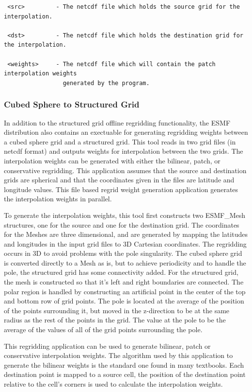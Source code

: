 \begin{verbatim}
 <src>         - The netcdf file which holds the source grid for the interpolation. 
 
 <dst>         - The netcdf file which holds the destination grid for the interpolation. 

 <weights>     - The netcdf file which will contain the patch interpolation weights 
                 generated by the program.

\end{verbatim}

\subsubsection{Cubed Sphere to Structured Grid}

 In addition to the structured grid offline regridding functionality, the ESMF distribution also 
contains an exectuable for generating regridding weights between a cubed sphere grid and
a structured grid. This tool reads in
two grid files (in netcdf format) and outputs weights for interpolation
between the two grids.  The interpolation weights can be generated with either the bilinear, patch, or
conservative regridding. This application assumes that the source and destination grids
are spherical and that the coordinates given in the files are latitude and longitude
values. This file based regrid weight generation application generates the interpolation weights
in parallel.

 To generate the interpolation weights, this tool first constructs two ESMF\_Mesh 
structures, one for the source and one for the destination grid. 
The coordinates for the Meshes are three dimensional, and are generated by mapping 
the latitudes and longitudes in the input grid files to 
3D Cartesian coordinates. The regridding occurs in 3D to avoid
problems with the pole singularity. The cubed sphere grid is converted directly to 
a Mesh as is, but to achieve periodicity and to handle the pole, the structured grid
has some connectivity added. For the structured grid, the mesh is constructed so that 
it's left and right boundaries are connected. The polar region is handled by constructing 
an artificial point in the center of the top and bottom row of grid points. 
The pole is located at the average of the position of the points surrounding
it, but moved in the z-direction to be at the same radius as the rest of the points
in the grid. The value at the pole to be the average of the values
of all of the grid points surrounding the pole. 

 This regridding application can be used to generate bilinear, patch or conservative interpolation weights. The 
algorithm used by this application to generate the bilinear weights is the standard one found in
many textbooks.  Each destination point is mapped to a source cell, the position of the destination point relative 
to the cell's corners is used to calculate the interpolation weights. 

